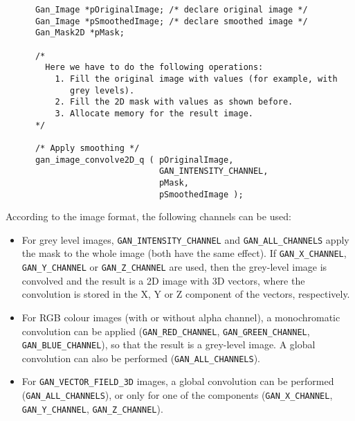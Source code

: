     \begin{verbatim}
      Gan_Image *pOriginalImage; /* declare original image */
      Gan_Image *pSmoothedImage; /* declare smoothed image */
      Gan_Mask2D *pMask;

      /*
        Here we have to do the following operations:
          1. Fill the original image with values (for example, with
             grey levels). 
          2. Fill the 2D mask with values as shown before.
          3. Allocate memory for the result image.
      */

      /* Apply smoothing */
      gan_image_convolve2D_q ( pOriginalImage, 
                               GAN_INTENSITY_CHANNEL,
                               pMask, 
                               pSmoothedImage );

    \end{verbatim}

    According to the image format, the following channels can be used:

    \begin{itemize}
      \item For grey level images, \texttt{GAN\_INTENSITY\_CHANNEL} and
            \texttt{GAN\_ALL\_CHANNELS} apply the mask to the whole image 
            (both have the same effect). If \texttt{GAN\_X\_CHANNEL}, 
            \texttt{GAN\_Y\_CHANNEL} or \texttt{GAN\_Z\_CHANNEL} are used, 
            then the grey-level image is convolved
            and the result is a 2D image with 3D vectors, where the
            convolution is stored in the X, Y or Z component of the vectors,
            respectively.

      \item For RGB colour images (with or without alpha channel), 
            a monochromatic convolution can be applied 
            (\texttt{GAN\_RED\_CHANNEL}, \texttt{GAN\_GREEN\_CHANNEL}, 
            \texttt{GAN\_BLUE\_CHANNEL}), so that the result is a grey-level 
            image. A global convolution can also be performed 
            (\texttt{GAN\_ALL\_CHANNELS}).

      \item For \texttt{GAN\_VECTOR\_FIELD\_3D} images, a global convolution 
            can be performed (\texttt{GAN\_ALL\_CHANNELS}), or only for one 
            of the components (\texttt{GAN\_X\_CHANNEL}, 
            \texttt{GAN\_Y\_CHANNEL}, \texttt{GAN\_Z\_CHANNEL}).

    \end{itemize}


